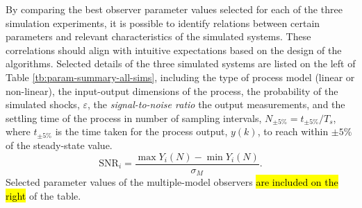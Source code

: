 By comparing the best observer parameter values selected for each of the three simulation experiments, it is possible to identify relations between certain parameters and relevant characteristics of the simulated systems. These correlations should align with intuitive expectations based on the design of the algorithms. Selected details of the three simulated systems are listed on the left of Table \ref{tb:param-summary-all-sims}, including the type of process model (linear or non-linear), the input-output dimensions of the process, the probability of the simulated shocks, $\varepsilon$, the \textit{signal-to-noise ratio}  the output measurements, and the settling time of the process in number of sampling intervals, $N_{\pm5\%}=t_{\pm 5\%} / T_s$, where $t_{\pm5\%}$ is the time taken for the process output, $y(k)$, to reach within $\pm5\%$ of the steady-state value.  
\begin{equation} \label{eq:SNR}
	\text{SNR}_i=\frac{\max{Y_i(N)}-\min{Y_i(N)}}{\sigma_M}.
\end{equation}%
Selected parameter values of the multiple-model observers \hl{are included on the right} of the table.
